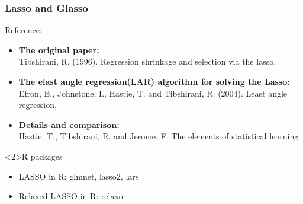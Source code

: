\documentclass{beamer}
\begin{document}
\begin{frame}
\frametitle{Lasso and Glasso }
  \begin{block}{Reference:}
    \begin{itemize}
        \item  \textbf{The original paper:}\\
        Tibshirani, R. (1996). Regression shrinkage and selection via the lasso.
        \item  \textbf{The elast angle regression(LAR) algorithm for solving the Lasso:}\\
        Efron, B., Johnstone, I., Hastie, T. and Tibshirani, R. (2004). Least angle
       regression,
       \item  \textbf{Details and comparison:}\\
            Hastie, T., Tibshirani, R. and Jerome, F. The elements of statistical
            learning
    \end{itemize}
  \end{block}

  \begin{block}<2>{R packages}
    \begin{itemize}
        \item  LASSO in R: glmnet, lasso2, lars
        \item  Relaxed LASSO in R: relaxo
    \end{itemize}
  \end{block}

\end{frame}
\end{document}
